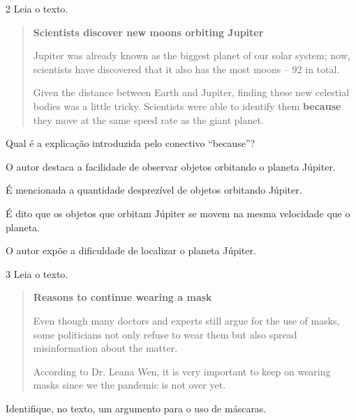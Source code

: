 \num{2} Leia o texto.

\begin{quote}
\textbf{Scientists discover new moons orbiting Jupiter}

Jupiter was already known as the biggest planet of our solar system; now, scientists have discovered that it also has the most moons – 92 in total.

Given the distance between Earth and Jupiter, finding these new celestial bodies was a little tricky. Scientists were able to identify them \textbf{because} they move at the same speed rate as the giant planet.

\end{quote}

Qual é a explicação introduzida pelo conectivo ``because''?

\begin{escolha}
\item O autor destaca a facilidade de observar objetos orbitando o planeta
Júpiter.

\item É mencionada a quantidade desprezível de objetos orbitando Júpiter.

\item É dito que os objetos que orbitam Júpiter se movem na mesma
velocidade que o planeta.

\item O autor expõe a dificuldade de localizar o planeta Júpiter.
\end{escolha}

\num{3} Leia o texto.


\begin{quote}
\textbf{Reasons to continue wearing a mask}

Even though many doctors and experts still argue for the use of masks, some politicians not only refuse to wear them but also spread misinformation about the matter.

According to Dr. Leana Wen, it is very important to keep on wearing masks since we the pandemic is not over yet. 

\end{quote}

Identifique, no texto, um argumento para o uso de máscaras.

